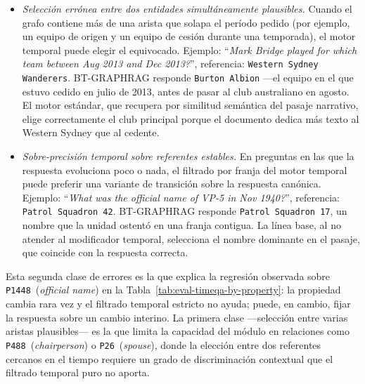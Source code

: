 \begin{itemize}
\item \emph{Selección errónea entre dos entidades simultáneamente plausibles.} Cuando el grafo contiene más de una arista que solapa el período pedido (por ejemplo, un equipo de origen y un equipo de cesión durante una temporada), el motor temporal puede elegir el equivocado. Ejemplo: ``\emph{Mark Bridge played for which team between Aug 2013 and Dec 2013?}'', referencia: \texttt{Western Sydney Wanderers}. BT-GRAPHRAG responde \texttt{Burton Albion} ---el equipo en el que estuvo cedido en julio de 2013, antes de pasar al club australiano en agosto. El motor estándar, que recupera por similitud semántica del pasaje narrativo, elige correctamente el club principal porque el documento dedica más texto al Western Sydney que al cedente.
\item \emph{Sobre-precisión temporal sobre referentes estables.} En preguntas en las que la respuesta evoluciona poco o nada, el filtrado por franja del motor temporal puede preferir una variante de transición sobre la respuesta canónica. Ejemplo: ``\emph{What was the official name of VP-5 in Nov 1940?}'', referencia: \texttt{Patrol Squadron 42}. BT-GRAPHRAG responde \texttt{Patrol Squadron 17}, un nombre que la unidad ostentó en una franja contigua. La línea base, al no atender al modificador temporal, selecciona el nombre dominante en el pasaje, que coincide con la respuesta correcta.
\end{itemize}

Esta segunda clase de errores es la que explica la regresión observada sobre \texttt{P1448}~(\emph{official name}) en la Tabla~\ref{tab:eval-timeqa-by-property}: la propiedad cambia rara vez y el filtrado temporal estricto no ayuda; puede, en cambio, fijar la respuesta sobre un cambio interino. La primera clase ---selección entre varias aristas plausibles--- es la que limita la capacidad del módulo en relaciones como \texttt{P488}~(\emph{chairperson}) o \texttt{P26}~(\emph{spouse}), donde la elección entre dos referentes cercanos en el tiempo requiere un grado de discriminación contextual que el filtrado temporal puro no aporta.

